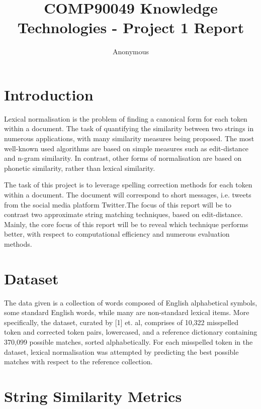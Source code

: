\documentclass[11pt]{article}
\title{COMP90049 Knowledge Technologies - Project 1 Report}
\author
{Anonymous}
\begin{document}
\maketitle



\section{Introduction}
Lexical normalisation is the problem of finding a canonical form for each token within a document. The task of quantifying the similarity between two strings in numerous applications, with many similarity measures being proposed. The most well-known used algorithms are based on simple measures such as edit-distance and n-gram similarity. In contrast, other forms of normalisation are based on phonetic similarity, rather than lexical similarity. 

The task of this project is to leverage spelling correction methods for each token within a document. The document will correspond to short messages, i.e. tweets from the social media platform Twitter.The focus of this report will be to contrast two approximate string matching techniques, based on edit-distance. Mainly, the core focus of this report will be to reveal which technique performs better, with respect to computational efficiency and numerous evaluation methods.

\section{Dataset}

The data given is a collection of words composed of English alphabetical symbols, some standard English words, while many are non-standard lexical items.
More specifically, the dataset, curated by [1] et. al, comprises of 10,322 misspelled token and corrected token pairs, lowercased, and a reference dictionary containing 370,099 possible matches, sorted alphabetically. For each misspelled token in the dataset, lexical normalisation was attempted by predicting the best possible matches with respect to the reference collection.



\section{String Similarity Metrics}
\end{document}
